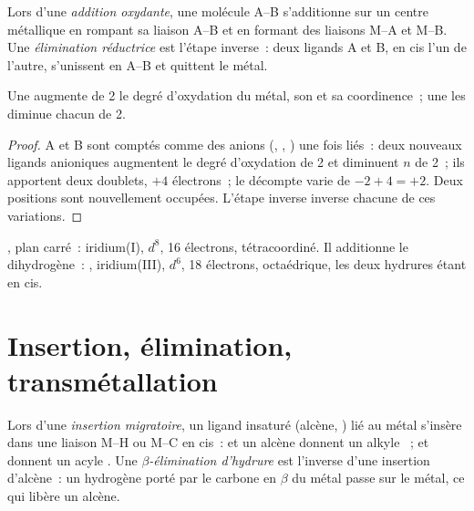 \begin{definition}\label{def:b2:catalytic-cycles:oxidative-addition}
Lors d'une \emph{addition oxydante}, une molécule A--B s'additionne sur un
centre métallique en rompant sa liaison A--B et en formant des liaisons M--A et M--B. Une
\emph{élimination réductrice} est l'étape inverse~: deux
ligands A et B, en cis l'un de l'autre, s'unissent en A--B et quittent le métal.
\end{definition}

\begin{proposition}\label{prop:b2:catalytic-cycles:oa}
Une  augmente de 2 le degré d'oxydation du métal, son  et sa coordinence~; une  les diminue chacun de 2.
\end{proposition}

\begin{proof}
A et B sont comptés comme des anions (, , ) une fois liés~: deux nouveaux ligands
anioniques augmentent le degré d'oxydation de 2 et diminuent $n$ de 2~; ils apportent deux doublets, $+4$
électrons~; le décompte varie de $-2 + 4 = +2$. Deux positions sont nouvellement occupées. L'étape
inverse inverse chacune de ces variations.
\end{proof}

\begin{example}\label{ex:b2:catalytic-cycles:vaska}
, plan carré~: iridium(I), $d^8$, 16 électrons, tétracoordiné.
Il additionne le dihydrogène~: , iridium(III), $d^6$, 18 électrons, octaédrique,
les deux hydrures étant en cis.
\end{example}

\section{Insertion, élimination, transmétallation}

\begin{definition}\label{def:b2:catalytic-cycles:insertion}
Lors d'une \emph{insertion migratoire}, un ligand insaturé
(alcène, ) lié au métal s'insère dans une liaison M--H ou M--C en cis~:  et un
alcène donnent un alkyle ~;  et  donnent un acyle .
Une \emph{$\beta$-élimination d'hydrure}
est l'inverse d'une insertion d'alcène~: un hydrogène porté par le carbone en $\beta$ du
métal passe sur le métal, ce qui libère un alcène.
\end{definition}

